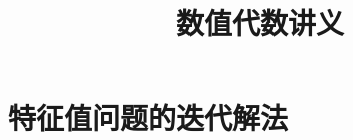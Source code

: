 \documentclass{book}
\begin{document}
\title{数值代数讲义}
\maketitle

\chapter{特征值问题的迭代解法}


\cite{stein2003}


\end{document}
